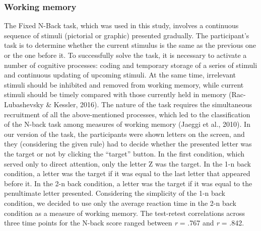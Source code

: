 \documentclass[authordate, empirical,issue]{jote-new-article}
\begin{document}
\subsubsection{Working memory}
The Fixed N-Back task, which was used in this study, involves a continuous sequence of stimuli (pictorial or graphic) presented gradually. The participant's task is to determine whether the current stimulus is the same as the previous one or the one before it. To successfully solve the task, it is necessary to activate a number of cognitive processes: coding and temporary storage of a series of stimuli and continuous updating of upcoming stimuli. At the same time, irrelevant stimuli should be inhibited and removed from working memory, while current stimuli should be timely compared with those currently held in memory (Rac-Lubashevsky \& Kessler, 2016). The nature of the task requires the simultaneous recruitment of all the above-mentioned processes, which led to the classification of the N-back task among measures of working memory (Jaeggi et al., 2010). In our version of the task, the participants were shown letters on the screen, and they (considering the given rule) had to decide whether the presented letter was the target or not by clicking the “target” button. In the first condition, which served only to direct attention, only the letter Z was the target. In the 1-n back condition, a letter was the target if it was equal to the last letter that appeared before it. In the 2-n back condition, a letter was the target if it was equal to the penultimate letter presented. Considering the simplicity of the 1-n back condition, we decided to use only the average reaction time in the 2-n back condition as a measure of working memory. The test-retest correlations across three time points for the N-back score ranged between \emph{r} = .767 and \emph{r} = .842.
\end{document}
